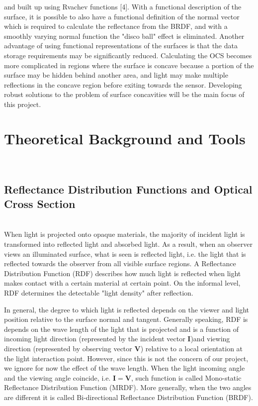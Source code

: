 \documentclass[11pt]{amsart}
\theoremstyle{definition}
\begin{document}
and built up using Rvachev functions [4]. With a functional description of the surface, it is possible to also have a functional
definition of the normal vector which is required to calculate the reflectance from the BRDF, and with a smoothly varying
normal function the "disco ball" effect is eliminated. Another advantage of using functional representations of the surfaces
is that the data storage requirements may be significantly reduced. Calculating the OCS becomes more complicated in
regions where the surface is concave because a portion of the surface may be hidden behind another area, and light may
make multiple reflections in the concave region before exiting towards the sensor. Developing robust solutions to the
problem of surface concavities will be the main focus of this project.


\section{Theoretical Background and Tools}~\\
\subsection{Reflectance Distribution Functions and Optical Cross Section}~\\
When light is projected onto opaque materials, the majority of incident light is transformed into reflected light and absorbed light. As a result, when an observer views an illuminated surface, what is seen is reflected light, i.e. the light that is reflected towards the observer from all visible surface regions. A Reflectance Distribution Function (RDF) describes how much light is reflected when light makes contact with a certain material at certain point. On the informal level, RDF determines the detectable "light density" after reflection. 

In general, the degree to which light is reflected depends on the viewer and
light position relative to the surface normal and tangent. Generally speaking, RDF is
depends on the wave length of the light that is projected and is a function of incoming light direction (represented by the incident vector
\textbf{I})and viewing direction (represented by observing vector \textbf{V})
relative to a local orientation at the light interaction point. However, since this is not the concern of our project, we ignore for now the effect of the wave length. When the light incoming angle and the viewing angle coincide, i.e. $\mathbf{I}=\mathbf{V}$, such function is called Mono-static Reflectance Distribution Function (MRDF). More generally, when the two angles are different it is called Bi-directional Reflectance Distribution Function (BRDF). 
\end{document}
